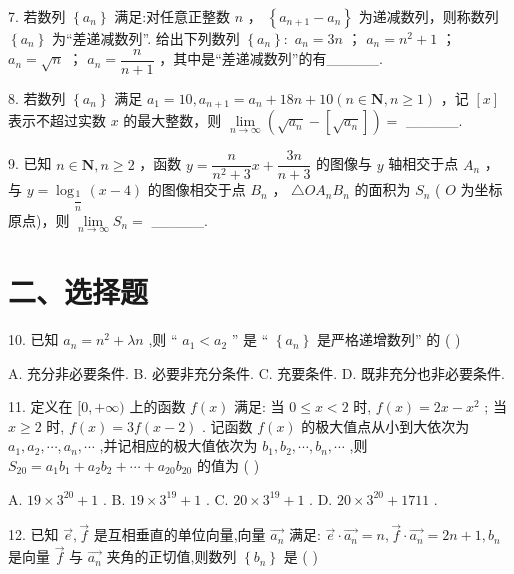 7. 若数列 $\left\{  {a}_{n}\right\}$ 满足:对任意正整数 $n$ ， $\left\{  {{a}_{n + 1} - {a}_{n}}\right\}$ 为递减数列，则称数列 $\left\{  {a}_{n}\right\}$ 为“差递减数列”. 给出下列数列 $\left\{  {a}_{n}\right\}   :$    ${a}_{n} = {3n}$ ；    ${a}_{n} = {n}^{2} + 1$ ；   ${a}_{n} = \sqrt{n}$ ；   ${a}_{n} = \dfrac{n}{n + 1}$ ，其中是“差递减数列”的有\_\_\_\_\_.

8. 若数列 $\left\{  {a}_{n}\right\}$ 满足 ${a}_{1} = {10},{a}_{n + 1} = {a}_{n} + {18n} + {10}\left( {n \in  \mathbf{N},n \geq  1}\right)$ ，记 $\left\lbrack  x\right\rbrack$ 表示不超过实数 $x$ 的最大整数，则 $\mathop{\lim }\limits_{{n \rightarrow  \infty }}\left( {\sqrt{{a}_{n}} - \left\lbrack  \sqrt{{a}_{n}}\right\rbrack  }\right)  =$ \_\_\_\_\_.

9. 已知 $n \in  \mathbf{N},n \geq  2$ ，函数 $y = \dfrac{n}{{n}^{2} + 3}x + \dfrac{3n}{n + 3}$ 的图像与 $y$ 轴相交于点 ${A}_{n}$ ，与 $y = {\log }_{\dfrac{1}{n}}\left( {x - 4}\right)$ 的图像相交于点 ${B}_{n}$ ， $\bigtriangleup  O{A}_{n}{B}_{n}$ 的面积为 ${S}_{n}$ ( $O$ 为坐标原点)，则 $\mathop{\lim }\limits_{{n \rightarrow  \infty }}{S}_{n} =$ \_\_\_\_\_.

\section*{二、选择题}

10. 已知 ${a}_{n} = {n}^{2} + {\lambda n}$ ,则 “ ${a}_{1} < {a}_{2}$ ” 是 “ $\left\{  {a}_{n}\right\}$ 是严格递增数列” 的 ( )

A. 充分非必要条件. B. 必要非充分条件. C. 充要条件. D. 既非充分也非必要条件.

11. 定义在 $\lbrack 0, + \infty )$ 上的函数 $f\left( x\right)$ 满足: 当 $0 \leq  x < 2$ 时, $f\left( x\right)  = {2x} - {x}^{2}$ ; 当 $x \geq  2$ 时, $f\left( x\right)  = {3f}\left( {x - 2}\right)$ . 记函数 $f\left( x\right)$ 的极大值点从小到大依次为 ${a}_{1},{a}_{2},\cdots ,{a}_{n},\cdots$ ,并记相应的极大值依次为 ${b}_{1},{b}_{2},\cdots ,{b}_{n},\cdots$ ,则 ${S}_{20} = {a}_{1}{b}_{1} + {a}_{2}{b}_{2} + \cdots  + {a}_{20}{b}_{20}$ 的值为 ( )

A. ${19} \times  {3}^{20} + 1$ . B. ${19} \times  {3}^{19} + 1$ . C. ${20} \times  {3}^{19} + 1$ . D. ${20} \times  {3}^{20} + {1711}$ .

12. 已知 $\overrightarrow{e},\overrightarrow{f}$ 是互相垂直的单位向量,向量 $\overrightarrow{{a}_{n}}$ 满足: $\overrightarrow{e} \cdot  \overrightarrow{{a}_{n}} = n,\overrightarrow{f} \cdot  \overrightarrow{{a}_{n}} = {2n} + 1,{b}_{n}$ 是向量 $\overrightarrow{f}$ 与 $\overrightarrow{{a}_{n}}$ 夹角的正切值,则数列 $\left\{  {b}_{n}\right\}$ 是 ( )

